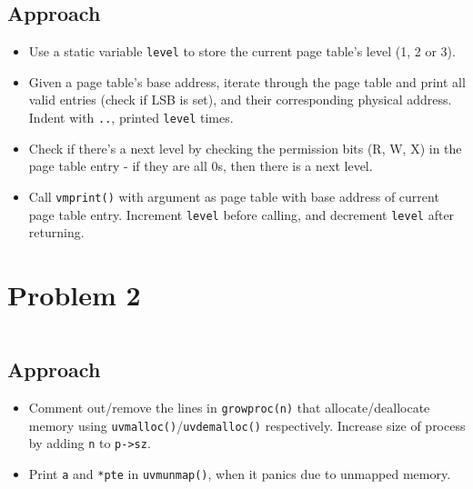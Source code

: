 \documentclass[11pt,a4paper,english]{paper}
\newenvironment{colorboxed}[4][gray]{
\begin{tcolorbox}[colback=#1!3!white,colframe=#1(ryb)!50!black,title=\textbf{#2: #3},#4]
}{
\end{tcolorbox}
}
\begin{document}
\subsection{Approach}
\begin{itemize}[noitemsep, nolistsep]
    \item Use a static variable \texttt{level} to store the current page table's level (1, 2 or 3).
    \item Given a page table's base address, iterate through the page table and print all valid entries (check if LSB is set), and their corresponding physical address. Indent with \texttt{..}, printed \texttt{level} times.
    \item Check if there's a next level by checking the permission bits (R, W, X) in the page table entry - if they are all 0s, then there is a next level.
    \item Call \texttt{vmprint()} with argument as page table with base address of current page table entry. Increment \texttt{level} before calling, and decrement \texttt{level} after returning.
\end{itemize}

\section{Problem 2}
\begin{colorboxed}{Code}{\texttt{kernel/proc.c::growproc()}}{unbreakable}
    \inputminted[baselinestretch=0.85,firstline=235,lastline=251,breaklines]{c}{kernel/proc.c}
\end{colorboxed}
\subsection{Approach}
\begin{itemize}[noitemsep, nolistsep]
    \item Comment out/remove the lines in \texttt{growproc(n)} that allocate/deallocate memory using \texttt{uvmalloc()}/\texttt{uvdemalloc()} respectively. Increase size of process by adding \texttt{n} to \texttt{p->sz}.
    \item Print \texttt{a} and \texttt{*pte} in \texttt{uvmunmap()}, when it panics due to unmapped memory.
\end{itemize}
\end{document}
